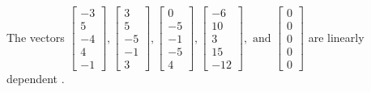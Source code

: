 \begin{exercise}
\begin{exerciseStatement}
  \end{exerciseStatement}
  \begin{exerciseAnswer}
   The vectors \(\left[\begin{array}{r}
-3 \\
5 \\
-4 \\
4 \\
-1
\end{array}\right] , \left[\begin{array}{r}
3 \\
5 \\
-5 \\
-1 \\
3
\end{array}\right] , \left[\begin{array}{r}
0 \\
-5 \\
-1 \\
-5 \\
4
\end{array}\right] , \left[\begin{array}{r}
-6 \\
10 \\
3 \\
15 \\
-12
\end{array}\right] , \text{ and } \left[\begin{array}{r}
0 \\
0 \\
0 \\
0 \\
0
\end{array}\right]\) are 
  	 linearly dependent  .
  


  \end{exerciseAnswer}
\end{exercise}